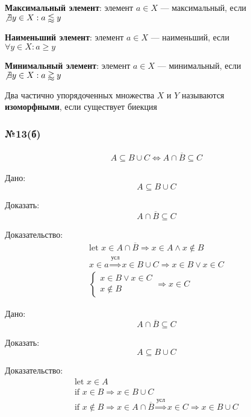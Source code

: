 \documentclass{article}
\begin{document}
\textbf{Максимальный элемент}: элемент $a \in X$ --- максимальный, если \\
$\not \exists y \in X : a \lessapprox y$

\textbf{Наименьший элемент}: элемент $a \in X$ --- наименьший, если \\
$\forall y \in X : a \ge y$

\textbf{Минимальный элемент}: элемент $a \in X$ --- минимальный, если \\
$\not \exists y \in X : a \gtrapprox y$

Два частично упорядоченных множества $X$ и $Y$ называются \\
\textbf{изоморфными}, если существует биекция

\subsubsection*{№13(б)}

\begin{gather*}
	A \subseteq B \cup C \Leftrightarrow A \cap \overline{B} \subseteq C
\end{gather*}

{\large Дано:}
\[ A \subseteq B \cup C \]

{\large Доказать:}
\[ A \cap \overline{B} \subseteq C \]

{\large Доказательство:}
\begin{gather*}
	\text{let } x \in A \cap \overline{B} \Rightarrow x \in A \land x \not \in B \\
	x \in a \stackrel{\text{усл}}{\Rightarrow} x \in B \cup C \Rightarrow x \in B \lor x \in C \\
	\begin{cases}
		x \in B \lor x \in C \\
		x \not \in B
	\end{cases} \Rightarrow x \in C
\end{gather*}

{\large Дано:}
\[ A \cap \overline{B} \subseteq C \]

{\large Доказать:}
\[ A \subseteq B \cup C \]

{\large Доказательство:}
\begin{gather*}
	\text{let } x \in A \\
	\text{if } x \in B \Rightarrow x \in B \cup C \\
	\text{if } x \not \in B \Rightarrow x \in A \cap \overline{B} \stackrel{\text{усл}}{\Rightarrow} x \in C \Rightarrow x \in B \cup C
\end{gather*}
\end{document}
